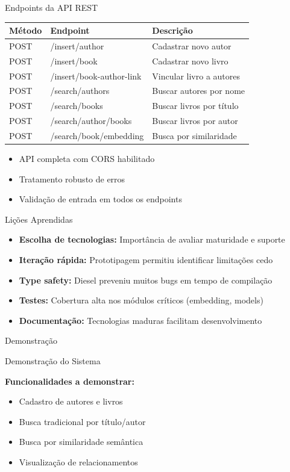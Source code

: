 \documentclass{beamer}
\begin{document}
\begin{frame}{Endpoints da API REST}
\begin{center}
\begin{tabular}{@{}p{1.5cm}p{4cm}p{4cm}@{}}
\toprule
\textbf{Método} & \textbf{Endpoint} & \textbf{Descrição} \\
\midrule
POST & /insert/author & Cadastrar novo autor \\
POST & /insert/book & Cadastrar novo livro \\
POST & /insert/book-author-link & Vincular livro a autores \\
POST & /search/authors & Buscar autores por nome \\
POST & /search/books & Buscar livros por título \\
POST & /search/author/books & Buscar livros por autor \\
POST & /search/book/embedding & Busca por similaridade \\
\bottomrule
\end{tabular}
\end{center}

\vspace{0.5cm}
\begin{itemize}
\item API completa com CORS habilitado
\item Tratamento robusto de erros
\item Validação de entrada em todos os endpoints
\end{itemize}
\end{frame}

\begin{frame}{Lições Aprendidas}
\begin{itemize}
\item \textbf{Escolha de tecnologias:} Importância de avaliar maturidade e suporte
\item \textbf{Iteração rápida:} Prototipagem permitiu identificar limitações cedo
\item \textbf{Type safety:} Diesel preveniu muitos bugs em tempo de compilação
\item \textbf{Testes:} Cobertura alta nos módulos críticos (embedding, models)
\item \textbf{Documentação:} Tecnologias maduras facilitam desenvolvimento
\end{itemize}
\end{frame}

\begin{frame}{Demonstração}
\begin{center}
{\Large Demonstração do Sistema}
\vspace{1cm}

\textbf{Funcionalidades a demonstrar:}
\begin{itemize}
\item Cadastro de autores e livros
\item Busca tradicional por título/autor
\item Busca por similaridade semântica
\item Visualização de relacionamentos
\end{itemize}
\end{center}
\end{frame}
\end{document}

